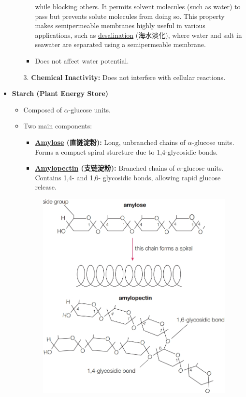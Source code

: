 \begin{itemize}
\begin{itemize}
\begin{itemize}
{            while blocking others. It permits solvent molecules (such as water) to pass but prevents solute molecules from doing
            so. This property makes semipermeable membranes highly useful in various applications, such as
            \underline{desalination} (海水淡化), where water and salt in seawater are separated using a semipermeable membrane.}
            \item Does not affect water potential.
        \end{itemize} 
        \item[3.] \textbf{Chemical Inactivity:} Does not interfere with cellular reactions.
    \end{itemize}
    \item \textbf{Starch (Plant Energy Store)}
    \begin{itemize}
        \item Composed of $\alpha$-glucose units.
        \item Two main components:
        \begin{itemize}
            \item \textbf{\underline{Amylose} (直链淀粉):} Long, unbranched chains of $\alpha$-glucose units. Forms a compact
            spiral sturcture due to 1,4-glycosidic bonds.
            \item \textbf{\underline{Amylopectin} (支链淀粉):} Branched chains of $\alpha$-glucose units. Contains 1,4- and 1,6-
            glycosidic bonds, allowing rapid glucose release.
        \end{itemize}
        \begin{figure}[H]
            \centering
            \includegraphics[scale=0.35]{Biology/1A/Images/1A-3-2.png}

\end{figure}
\end{itemize}
\end{itemize}
